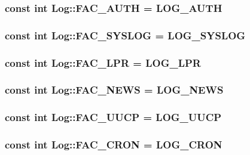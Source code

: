 \subsubsection{\setlength{\rightskip}{0pt plus 5cm}const int {\bf Log::FAC\_\-AUTH} = LOG\_\-AUTH\hspace{0.3cm}{\tt  [static]}}\label{classLog_6f6fde7b6433d827c05cfefe16f9b333}


\subsubsection{\setlength{\rightskip}{0pt plus 5cm}const int {\bf Log::FAC\_\-SYSLOG} = LOG\_\-SYSLOG\hspace{0.3cm}{\tt  [static]}}\label{classLog_be74100156fee45add0417bc9f460f30}


\subsubsection{\setlength{\rightskip}{0pt plus 5cm}const int {\bf Log::FAC\_\-LPR} = LOG\_\-LPR\hspace{0.3cm}{\tt  [static]}}\label{classLog_28a1239643de68f79ad6c2337acfd2ea}


\subsubsection{\setlength{\rightskip}{0pt plus 5cm}const int {\bf Log::FAC\_\-NEWS} = LOG\_\-NEWS\hspace{0.3cm}{\tt  [static]}}\label{classLog_b9f56520aeae70b9d98396f67ad1310b}


\subsubsection{\setlength{\rightskip}{0pt plus 5cm}const int {\bf Log::FAC\_\-UUCP} = LOG\_\-UUCP\hspace{0.3cm}{\tt  [static]}}\label{classLog_d5b2e5f3987835ec077013c6a263ed5f}


\subsubsection{\setlength{\rightskip}{0pt plus 5cm}const int {\bf Log::FAC\_\-CRON} = LOG\_\-CRON\hspace{0.3cm}{\tt  [static]}}\label{classLog_6a455dfca6d859f77ed79b6d92ad659a}


